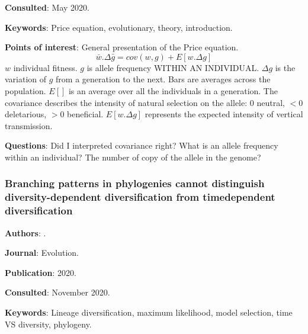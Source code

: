 \documentclass[12pt,a4paper]{article}
\begin{document}
\textbf{Consulted}: May 2020.

\textbf{Keywords}: Price equation, evolutionary, theory, introduction.

\textbf{Points of interest}: General presentation of the Price equation.
\begin{equation}
\bar{w}.\Delta\bar{g} = cov(w,g) + E[w.\Delta g]
\end{equation}
$w$ individual fitness. $g$ is allele frequency WITHIN AN INDIVIDUAL. $\Delta{g}$ is the variation of $g$ from a generation to the next. Bars are averages across the population. $E[]$ is an average over all the individuals in a generation.
The covariance describes the intensity of natural selection on the allele: 0 neutral, $<0$ deletarious, $>0$ beneficial.
$E[w.\Delta g]$ represents the expected intensity of vertical transmission.

\textbf{Questions}: Did I interpreted covariance right? What is an allele frequency within an individual? The number of copy of the allele in the genome?

\newpage

\subsubsection*{Branching patterns in phylogenies cannot distinguish diversity-dependent diversification from timedependent diversification}

\textbf{Authors}: \cite{pannetier2020branching}.

\textbf{Journal}: Evolution.

\textbf{Publication}: 2020.

\textbf{Consulted}: November 2020.

\textbf{Keywords}: Lineage diversification, maximum likelihood, model selection, time VS diversity, phylogeny.
\end{document}

